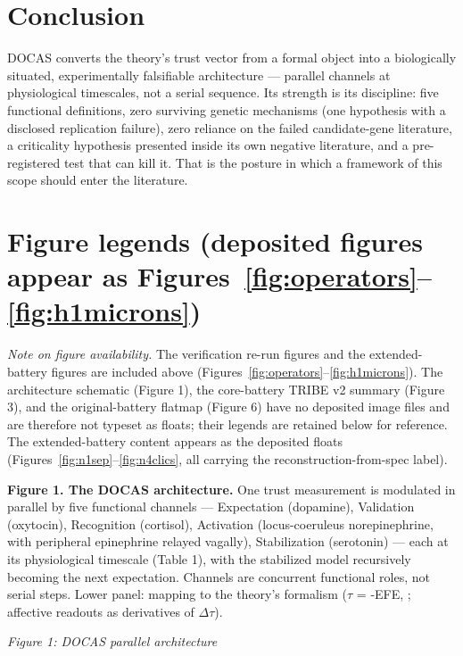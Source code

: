 \documentclass[11pt,twocolumn]{article}
\theoremstyle{plain}
\begin{document}
\FloatBarrier
\section{Conclusion}

DOCAS converts the theory's trust vector from a formal object into a biologically situated, experimentally falsifiable architecture — parallel channels at physiological timescales, not a serial sequence. Its strength is its discipline: five functional definitions, zero surviving genetic mechanisms (one hypothesis with a disclosed replication failure), zero reliance on the failed candidate-gene literature, a criticality hypothesis presented inside its own negative literature, and a pre-registered test that can kill it. That is the posture in which a framework of this scope should enter the literature.


\FloatBarrier
\section*{Figure legends (deposited figures appear as Figures~\ref{fig:operators}--\ref{fig:h1microns})}

\noindent\textit{Note on figure availability.} The verification re-run figures and the extended-battery figures are included above (Figures~\ref{fig:operators}--\ref{fig:h1microns}). The architecture schematic (Figure 1), the core-battery TRIBE v2 summary (Figure 3), and the original-battery flatmap (Figure 6) have no deposited image files and are therefore not typeset as floats; their legends are retained below for reference. The extended-battery content appears as the deposited floats (Figures~\ref{fig:n1sep}--\ref{fig:n4clics}, all carrying the reconstruction-from-spec label).



\textbf{Figure 1. The DOCAS architecture.} One trust measurement is modulated in parallel by five functional channels — Expectation (dopamine), Validation (oxytocin), Recognition (cortisol), Activation (locus-coeruleus norepinephrine, with peripheral epinephrine relayed vagally), Stabilization (serotonin) — each at its physiological timescale (Table 1), with the stabilized model recursively becoming the next expectation. Channels are concurrent functional roles, not serial steps. Lower panel: mapping to the theory's formalism ($\tau$ = -EFE, \citealp{friston2015,friston2017}; affective readouts as derivatives of $\Delta\tau$).

\textit{Figure 1: DOCAS parallel architecture}
\end{document}
